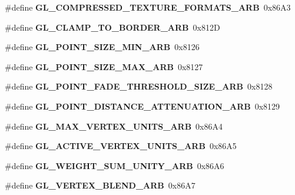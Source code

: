 \begin{DoxyCompactItemize}
\item 
\#define {\bfseries G\+L\+\_\+\+C\+O\+M\+P\+R\+E\+S\+S\+E\+D\+\_\+\+T\+E\+X\+T\+U\+R\+E\+\_\+\+F\+O\+R\+M\+A\+T\+S\+\_\+\+A\+R\+B}~0x86\+A3\label{_s_d_l__opengl_8h_a627e0a3efa826d10a7d46d0b4d6a9098}

\item 
\#define {\bfseries G\+L\+\_\+\+C\+L\+A\+M\+P\+\_\+\+T\+O\+\_\+\+B\+O\+R\+D\+E\+R\+\_\+\+A\+R\+B}~0x812\+D\label{_s_d_l__opengl_8h_a4e575170092853f85624ce37e614e207}

\item 
\#define {\bfseries G\+L\+\_\+\+P\+O\+I\+N\+T\+\_\+\+S\+I\+Z\+E\+\_\+\+M\+I\+N\+\_\+\+A\+R\+B}~0x8126\label{_s_d_l__opengl_8h_a3dffec2a58d27eeda9baca31088940b0}

\item 
\#define {\bfseries G\+L\+\_\+\+P\+O\+I\+N\+T\+\_\+\+S\+I\+Z\+E\+\_\+\+M\+A\+X\+\_\+\+A\+R\+B}~0x8127\label{_s_d_l__opengl_8h_a015ae9d32c5b744a62492459147efe83}

\item 
\#define {\bfseries G\+L\+\_\+\+P\+O\+I\+N\+T\+\_\+\+F\+A\+D\+E\+\_\+\+T\+H\+R\+E\+S\+H\+O\+L\+D\+\_\+\+S\+I\+Z\+E\+\_\+\+A\+R\+B}~0x8128\label{_s_d_l__opengl_8h_adf9966c52f3900df31a76bd615db351d}

\item 
\#define {\bfseries G\+L\+\_\+\+P\+O\+I\+N\+T\+\_\+\+D\+I\+S\+T\+A\+N\+C\+E\+\_\+\+A\+T\+T\+E\+N\+U\+A\+T\+I\+O\+N\+\_\+\+A\+R\+B}~0x8129\label{_s_d_l__opengl_8h_a8436c933eb189392754de2518665d94c}

\item 
\#define {\bfseries G\+L\+\_\+\+M\+A\+X\+\_\+\+V\+E\+R\+T\+E\+X\+\_\+\+U\+N\+I\+T\+S\+\_\+\+A\+R\+B}~0x86\+A4\label{_s_d_l__opengl_8h_a9e24ccd85383bb763c2429341d5fa705}

\item 
\#define {\bfseries G\+L\+\_\+\+A\+C\+T\+I\+V\+E\+\_\+\+V\+E\+R\+T\+E\+X\+\_\+\+U\+N\+I\+T\+S\+\_\+\+A\+R\+B}~0x86\+A5\label{_s_d_l__opengl_8h_afe03e7507dba029c5c728e80a9f4e4f6}

\item 
\#define {\bfseries G\+L\+\_\+\+W\+E\+I\+G\+H\+T\+\_\+\+S\+U\+M\+\_\+\+U\+N\+I\+T\+Y\+\_\+\+A\+R\+B}~0x86\+A6\label{_s_d_l__opengl_8h_a766a854ce8b2dfa88b18335c531b39f5}

\item 
\#define {\bfseries G\+L\+\_\+\+V\+E\+R\+T\+E\+X\+\_\+\+B\+L\+E\+N\+D\+\_\+\+A\+R\+B}~0x86\+A7\label{_s_d_l__opengl_8h_a1c2f7d3159c88badaf40fb6cb2a98e98}


\end{DoxyCompactItemize}
